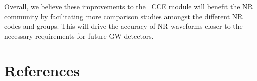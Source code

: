 \begin{bibunit}[unsrtnat]
Overall, we believe these improvements to the \spectre~CCE module will benefit
the NR community by facilitating more comparison studies amongst the different
NR codes and groups. This will drive the accuracy of NR waveforms closer to the
necessary requirements for future GW detectors.

\section*{References}
\putbib[refs]

\end{bibunit}
